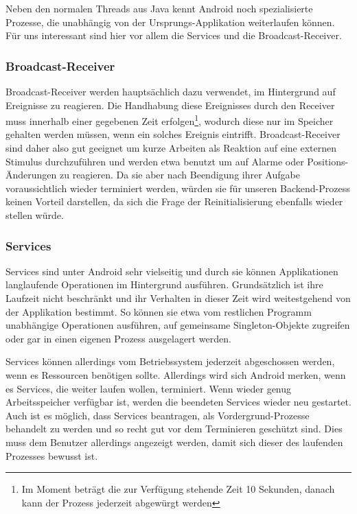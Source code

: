 Neben den normalen Threads aus Java kennt Android noch spezialisierte Prozesse, die unabhängig von der Ursprungs-Applikation weiterlaufen können. Für uns interessant sind hier vor allem die Services und die Broadcast-Receiver.

\subsubsection{Broadcast-Receiver}

Broadcast-Receiver werden hauptsächlich dazu verwendet, im Hintergrund auf Ereignisse zu reagieren. Die Handhabung diese Ereignisses durch den Receiver muss innerhalb einer gegebenen Zeit erfolgen\footnote{Im Moment beträgt die zur Verfügung stehende Zeit 10 Sekunden, danach kann der Prozess jederzeit abgewürgt werden\cite{adbmt}}, wodurch diese nur im Speicher gehalten werden müssen, wenn ein solches Ereignis eintrifft. Broadcast-Receiver sind daher also gut geeignet um kurze Arbeiten als Reaktion auf eine externen Stimulus durchzuführen und werden etwa benutzt um auf Alarme oder Positions-Änderungen zu reagieren. Da sie aber nach Beendigung ihrer Aufgabe voraussichtlich wieder terminiert werden, würden sie für unseren Backend-Prozess keinen Vorteil darstellen, da sich die Frage der Reinitialisierung ebenfalls wieder stellen würde.

\subsubsection{Services}

Services sind unter Android sehr vielseitig und durch sie können Applikationen langlaufende Operationen im Hintergrund ausführen. Grundsätzlich ist ihre Laufzeit nicht beschränkt und ihr Verhalten in dieser Zeit wird weitestgehend von der Applikation bestimmt. So können sie etwa vom restlichen Programm unabhängige Operationen ausführen, auf gemeinsame Singleton-Objekte zugreifen oder gar in einen eigenen Prozess ausgelagert werden.

Services können allerdings vom Betriebssystem jederzeit abgeschossen werden, wenn es Ressourcen benötigen sollte. Allerdings wird sich Android merken, wenn es Services, die weiter laufen wollen, terminiert. Wenn wieder genug Arbeitsspeicher verfügbar ist, werden die beendeten Services wieder neu gestartet. Auch ist es möglich, dass Services beantragen, als Vordergrund-Prozesse behandelt zu werden und so recht gut vor dem Terminieren geschützt sind. Dies muss dem Benutzer allerdings angezeigt werden, damit sich dieser des laufenden Prozesses bewusst ist.

